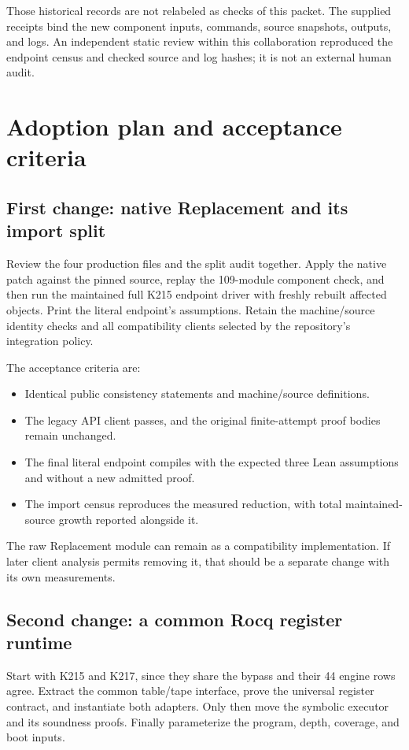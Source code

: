\documentclass[11pt,a4paper]{article}
\theoremstyle{remark}
\begin{document}
Those historical records are not relabeled as checks of this packet.
The supplied receipts bind the new component inputs, commands, source
snapshots, outputs, and logs. An independent static review within this
collaboration reproduced the endpoint census and checked source and log hashes;
it is not an external human audit.

\section{Adoption plan and acceptance criteria}
\label{sec:adoption}
\subsection{First change: native Replacement and its import split}
Review the four production files and the split audit together.
Apply the native patch against the pinned source, replay the 109-module
component check, and then run the maintained full K215 endpoint driver with
freshly rebuilt affected objects. Print the literal endpoint's assumptions.
Retain the machine/source identity checks and all compatibility clients
selected by the repository's integration policy.

The acceptance criteria are:
\begin{itemize}
\item Identical public consistency statements and machine/source definitions.
\item The legacy API client passes, and the original finite-attempt proof
bodies remain unchanged.
\item The final literal endpoint compiles with the expected three Lean
assumptions and without a new admitted proof.
\item The import census reproduces the measured reduction, with total
maintained-source growth reported alongside it.
\end{itemize}
The raw Replacement module can remain as a compatibility implementation.
If later client analysis permits removing it, that should be a separate
change with its own measurements.

\subsection{Second change: a common Rocq register runtime}
Start with K215 and K217, since they share the bypass and their 44 engine
rows agree. Extract the common table/tape interface, prove the universal
register contract, and instantiate both adapters. Only then move the
symbolic executor and its soundness proofs. Finally parameterize the
program, depth, coverage, and boot inputs.
\end{document}
